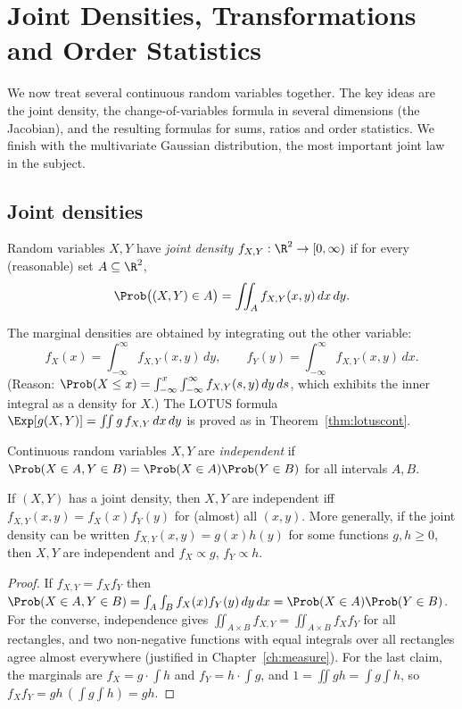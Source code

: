 \chapter{Joint Densities, Transformations and Order Statistics}
\label{ch:jointcont}

We now treat several continuous random variables together. The key ideas are the
joint density, the change-of-variables formula in several dimensions (the
Jacobian), and the resulting formulas for sums, ratios and order statistics. We
finish with the multivariate Gaussian distribution, the most important joint law
in the subject.

\section{Joint densities}

\begin{definition}
Random variables $X,Y$ have \emph{joint density} $f_{X,Y}:\R^2\to[0,\infty)$ if
for every (reasonable) set $A\subseteq\R^2$,
\[
\Prob\bigl((X,Y)\in A\bigr)=\iint_Af_{X,Y}(x,y)\,dx\,dy.
\]
\end{definition}

The marginal densities are obtained by integrating out the other variable:
\[
f_X(x)=\int_{-\infty}^\infty f_{X,Y}(x,y)\,dy,\qquad
f_Y(y)=\int_{-\infty}^\infty f_{X,Y}(x,y)\,dx .
\]
(Reason: $\Prob(X\le x)=\int_{-\infty}^x\int_{-\infty}^\infty f_{X,Y}(s,y)\,dy\,ds$,
which exhibits the inner integral as a density for $X$.) The LOTUS formula
$\Exp[g(X,Y)]=\iint g\,f_{X,Y}\,dx\,dy$ is proved as in
Theorem~\ref{thm:lotuscont}.

\begin{definition}[Independence]
Continuous random variables $X,Y$ are \emph{independent} if
$\Prob(X\in A,Y\in B)=\Prob(X\in A)\Prob(Y\in B)$ for all intervals $A,B$.
\end{definition}

\begin{theorem}\label{thm:indfactor}
If $(X,Y)$ has a joint density, then $X,Y$ are independent iff
$f_{X,Y}(x,y)=f_X(x)f_Y(y)$ for (almost) all $(x,y)$. More generally, if the joint
density can be written $f_{X,Y}(x,y)=g(x)h(y)$ for some functions $g,h\ge0$, then
$X,Y$ are independent and $f_X\propto g$, $f_Y\propto h$.
\end{theorem}
\begin{proof}
If $f_{X,Y}=f_Xf_Y$ then $\Prob(X\in A,Y\in B)=\int_A\int_Bf_X(x)f_Y(y)\,dy\,dx=
\Prob(X\in A)\Prob(Y\in B)$. For the converse, independence gives
$\iint_{A\times B}f_{X,Y}=\iint_{A\times B}f_Xf_Y$ for all rectangles, and two
non-negative functions with equal integrals over all rectangles agree almost
everywhere (justified in Chapter~\ref{ch:measure}). For the last claim, the
marginals are $f_X=g\cdot\int h$ and $f_Y=h\cdot\int g$, and
$1=\iint gh=\int g\int h$, so $f_Xf_Y=gh\,(\int g\int h)=gh$.
\end{proof}

